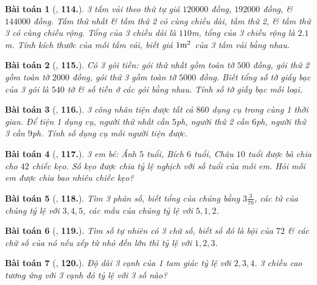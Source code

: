 \documentclass{article}
\numberwithin{equation}{section}
\newtheorem{baitoan}{Bài toán}
\begin{document}
\begin{baitoan}[\cite{Binh_Toan_7_tap_1}, \textbf{114.}]
	3 tấm vải theo thứ tự giá $120000$ đồng, $192000$ đồng, \& $144000$ đồng. Tấm thứ nhất \& tấm thứ 2 có cùng chiều dài, tấm thứ 2, \& tấm thứ 3 có cùng chiều rộng. Tổng của 3 chiều dài là $110$\emph{m}, tổng của 3 chiều rộng là $2.1$\emph{m}. Tính kích thước của mỗi tấm vải, biết giá $\rm1m^2$ của 3 tấm vải bằng nhau.
\end{baitoan}

\begin{baitoan}[\cite{Binh_Toan_7_tap_1}, \textbf{115.}]
	Có 3 gói tiền: gói thứ nhất gồm toàn tờ $500$ đồng, gói thứ 2 gồm toàn tờ $2000$ đồng, gói thứ 3 gồm toàn tờ $5000$ đồng. Biết tổng số tờ giấy bạc của 3 gói là $540$ tờ \& số tiền ở các gói bằng nhau. Tính số tờ giấy bạc mỗi loại.
\end{baitoan}

\begin{baitoan}[\cite{Binh_Toan_7_tap_1}, \textbf{116.}]
	3 công nhân tiện được tất cả $860$ dụng cụ trong cùng 1 thời gian. Để tiện 1 dụng cụ, người thứ nhất cần $5$\emph{ph}, người thứ 2 cần $6$\emph{ph}, người thứ 3 cần $9$\emph{ph}. Tính số dụng cụ mỗi người tiện được.
\end{baitoan}

\begin{baitoan}[\cite{Binh_Toan_7_tap_1}, \textbf{117.}]
	3 em bé: Ánh $5$ tuổi, Bích $6$ tuổi, Châu $10$ tuổi được bà chia cho $42$ chiếc kẹo. Số kẹo được chia tỷ lệ nghịch với số tuổi của mỗi em. Hỏi mỗi em được chia bao nhiêu chiếc kẹo?
\end{baitoan}

\begin{baitoan}[\cite{Binh_Toan_7_tap_1}, \textbf{118.}]
	Tìm 3 phân số, biết tổng của chúng bằng $3\frac{3}{70}$, các tử của chúng tỷ lệ với $3,4,5$, các mẫu của chúng tỷ lệ với $5,1,2$.
\end{baitoan}

\begin{baitoan}[\cite{Binh_Toan_7_tap_1}, \textbf{119.}]
	Tìm số tự nhiên có 3 chữ số, biết số đó là bội của $72$ \& các chữ số của nó nếu xếp từ nhỏ đến lớn thì tỷ lệ với $1,2,3$.
\end{baitoan}

\begin{baitoan}[\cite{Binh_Toan_7_tap_1}, \textbf{120.}]
	Độ dài 3 cạnh của 1 tam giác tỷ lệ với $2,3,4$. 3 chiều cao tương ứng với 3 cạnh đó tỷ lệ với 3 số nào?
\end{baitoan}
\end{document}
